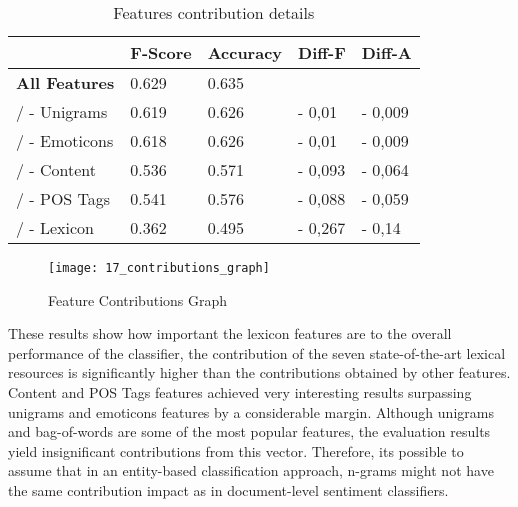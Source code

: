 \begin{table}[H]
\centering
\caption{Features contribution details}
\label{tab:contributions}
\begin{tabular}{l|l|l|l|l}
\multicolumn{1}{c|}{{\color[HTML]{000000} \textbf{}}} & \textbf{F-Score} & \textbf{Accuracy} & \textbf{Diff-F} & \textbf{Diff-A} \\ \hline
{\color[HTML]{000000} \textbf{All Features}}          & 0.629            & 0.635             &                 &                 \\ \hline
/ - Unigrams                                          & 0.619            & 0.626             & - 0,01          & - 0,009         \\ \hline
/ - Emoticons                                         & 0.618            & 0.626             & - 0,01          & - 0,009         \\ \hline
/ - Content                                           & 0.536            & 0.571             & - 0,093         & - 0,064         \\ \hline
/ - POS Tags                                          & 0.541            & 0.576             & - 0,088         & - 0,059         \\ \hline
/ - Lexicon                                           & 0.362            & 0.495             & - 0,267         & - 0,14          \\ \hline
\end{tabular}
\end{table}

\begin{figure}[H]
    \centering
    \caption[Features Contribution Graph]{Feature Contributions Graph}
    \texttt{[image: 17\_contributions\_graph]}
    \label{fig17:contributions_graph}
\end{figure}

These results show how important the lexicon features are to the overall performance of the classifier, the contribution of the seven state-of-the-art lexical resources is significantly higher than the contributions obtained by other features. Content and POS Tags features achieved very interesting results surpassing unigrams and emoticons features by a considerable margin. Although unigrams and bag-of-words are some of the most popular features, the evaluation results yield insignificant contributions from this vector. Therefore, its possible to assume that in an entity-based classification approach, n-grams might not have the same contribution impact as in document-level sentiment classifiers.   

